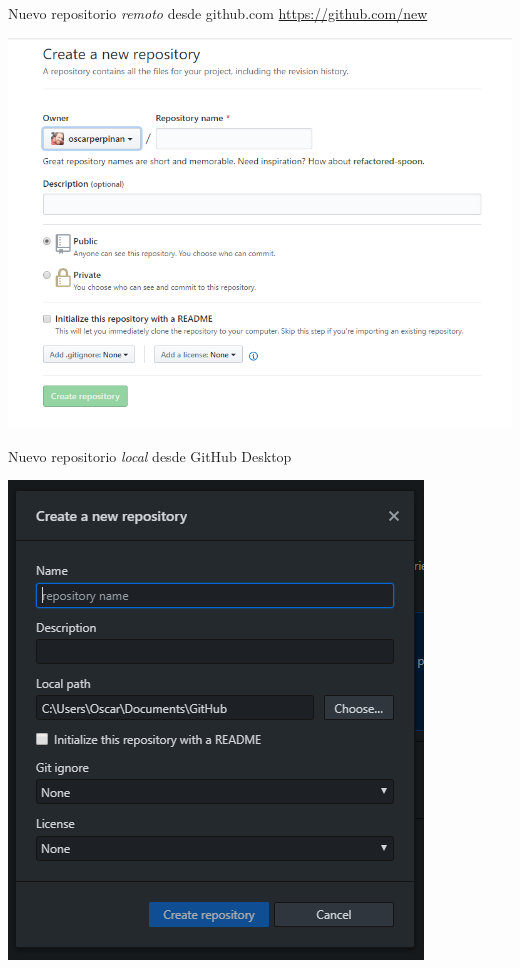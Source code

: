 \documentclass[xcolor={usenames,svgnames,dvipsnames}]{beamer}
\begin{document}
\begin{frame}[label={sec:org95be6e8}]{Nuevo repositorio \emph{remoto} desde github.com}
\url{https://github.com/new}

\begin{center}
\includegraphics[width=.9\linewidth]{figs/GitHub_New_Repository.png}
\end{center}
\end{frame}

\begin{frame}[label={sec:org5bb96d9}]{Nuevo repositorio \emph{local} desde GitHub Desktop}
\begin{center}
\end{center}

\begin{center}
\includegraphics[height=0.7\textheight]{figs/Desktop_NewRepository.png}
\end{center}
\end{frame}
\end{document}
